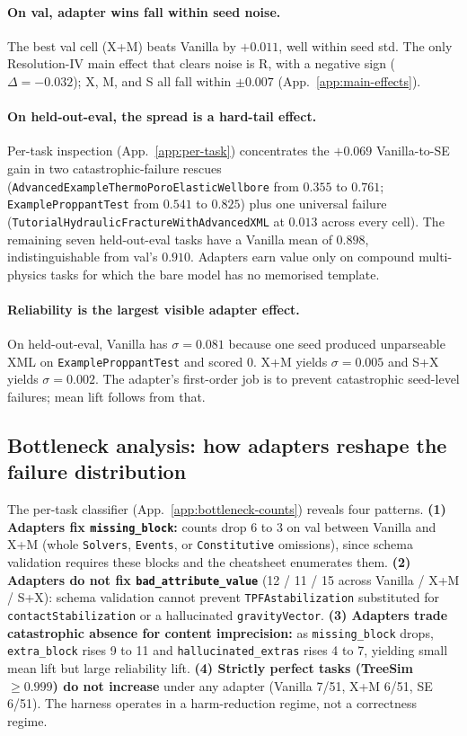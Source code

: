 \documentclass{article}
\begin{document}
\paragraph{On val, adapter wins fall within seed noise.} The best val cell (X+M) beats Vanilla by $+0.011$, well within seed std. The only Resolution-IV main effect that clears noise is R, with a negative sign ($\Delta = -0.032$); X, M, and S all fall within $\pm 0.007$ (App.~\ref{app:main-effects}).

\paragraph{On held-out-eval, the spread is a hard-tail effect.}\label{subsec:per-task} Per-task inspection (App.~\ref{app:per-task}) concentrates the $+0.069$ Vanilla-to-SE gain in two catastrophic-failure rescues (\texttt{AdvancedExampleThermoPoroElasticWellbore} from $0.355$ to $0.761$; \texttt{ExampleProppantTest} from $0.541$ to $0.825$) plus one universal failure (\texttt{TutorialHydraulicFractureWithAdvancedXML} at $0.013$ across every cell). The remaining seven held-out-eval tasks have a Vanilla mean of $0.898$, indistinguishable from val's $0.910$. Adapters earn value only on compound multi-physics tasks for which the bare model has no memorised template.

\paragraph{Reliability is the largest visible adapter effect.} On held-out-eval, Vanilla has $\sigma=0.081$ because one seed produced unparseable XML on \texttt{ExampleProppantTest} and scored 0. X+M yields $\sigma=0.005$ and S+X yields $\sigma=0.002$. The adapter's first-order job is to prevent catastrophic seed-level failures; mean lift follows from that.

\subsection{Bottleneck analysis: how adapters reshape the failure distribution}
\label{subsec:bottleneck-results}

The per-task classifier (App.~\ref{app:bottleneck-counts}) reveals four patterns. \textbf{(1) Adapters fix \texttt{missing\_block}:} counts drop 6 to 3 on val between Vanilla and X+M (whole \texttt{Solvers}, \texttt{Events}, or \texttt{Constitutive} omissions), since schema validation requires these blocks and the cheatsheet enumerates them. \textbf{(2) Adapters do not fix \texttt{bad\_attribute\_value}} (12 / 11 / 15 across Vanilla / X+M / S+X): schema validation cannot prevent \texttt{TPFAstabilization} substituted for \texttt{contactStabilization} or a hallucinated \texttt{gravityVector}. \textbf{(3) Adapters trade catastrophic absence for content imprecision:} as \texttt{missing\_block} drops, \texttt{extra\_block} rises 9 to 11 and \texttt{hallucinated\_extras} rises 4 to 7, yielding small mean lift but large reliability lift. \textbf{(4) Strictly perfect tasks (TreeSim $\geq 0.999$) do not increase} under any adapter (Vanilla 7/51, X+M 6/51, SE 6/51). The harness operates in a harm-reduction regime, not a correctness regime.
\end{document}
